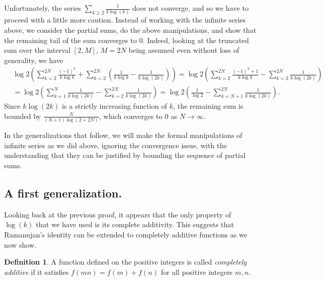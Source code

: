 \documentclass[11pt,oneside,reqno]{article}
\theoremstyle{definition}
\newtheorem*{definition}{Definition}
\begin{document}
Unfortunately, the series $\sum_{k\ge2}\frac{1}{k\log(k)}$ does not converge, and so we have to proceed with a little more caution. Instead of working with the infinite series above, we consider the partial sums, do the above manipulations, and show that the remaining tail of the sum converges to $0$. Indeed, looking at the truncated sum over the interval $\left[2,M\right]$, $M=2N$ being assumed even without loss of generality, we have 
\begin{align}
\nonumber
&\log2\left(\sum_{k=2}^{2N}\frac{\left(-1\right)^{k}}{k\log k}+\sum_{k=2}^{2N}\left(\frac{1}{k\log k}-\frac{1}{k\log\left(2k\right)}\right)\right)=\log2\left(\sum_{k=2}^{2N}\frac{\left(-1\right)^{k}+1}{k\log k}-\sum_{k=2}^{2N}\frac{1}{k\log\left(2k\right)}\right)\\
&=\log2\left(\sum_{k=1}^N\frac{1}{k\log(2k)}-\sum_{k=2}^{2N}\frac{1}{k\log(2k)}\right)
=\log2\left(\frac{1}{\log2}-\sum_{k=N+1}^{2N}\frac{1}{k\log(2k)}\right).
\end{align}
Since $k\log(2k)$ is a strictly increasing function of $k$, the remaining sum is bounded by $\frac{N}{\left(N+1\right)\log(2+2N)}$, which 
converges to $0$ as $N\to \infty$. 

In the generalizations that follow, we will make the formal manipulations of infinite series as we did above, ignoring the convergence issue,  with the understanding that they can be justified by bounding the sequence of partial sums.

\subsection{A first generalization.}


Looking back at the previous proof, it appears that the only property of $\log(k)$ that we have used is its complete additivity. This suggests that Ramanujan's identity can be extended to completely additive functions as we now show.

\begin{definition}
A function defined on the positive integers is called \textit{completely additive} if it satisfies $f(mn)=f(m)+f(n)$ for all positive integers $m,n$.     
\end{definition}
\end{document}
